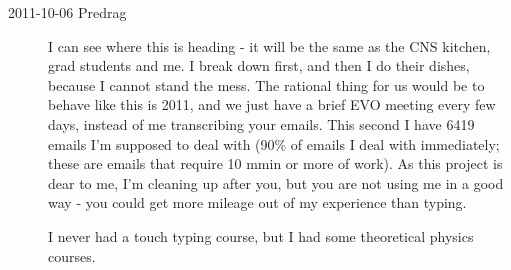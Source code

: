 \begin{description}
\item[2011-10-06 Predrag]
I can see where this is heading - it will be the same as the CNS kitchen,
grad students and me. I break down first, and then I do their dishes,
because I cannot stand the mess. The rational thing for us would be to
behave like this is 2011, and we just have a brief EVO meeting every few
days, instead of me transcribing your emails. This second I have 6419
emails I'm supposed to deal with (90\% of emails I deal with immediately;
these are emails that require 10 mmin or more of work). As this project
is dear to me, I'm cleaning up after you, but you are not using me in a
good way - you could get more mileage out of my experience than typing.

I never had a touch typing course, but I had some theoretical physics
courses.



\end{description}
